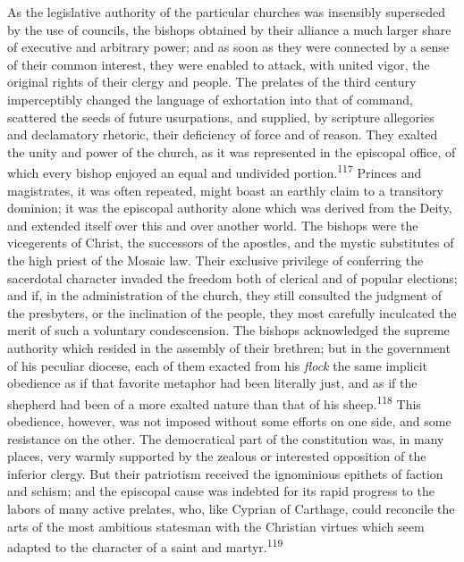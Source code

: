 As the legislative authority of the particular churches was
insensibly superseded by the use of councils, the bishops
obtained by their alliance a much larger share of executive and
arbitrary power; and as soon as they were connected by a sense of
their common interest, they were enabled to attack, with united
vigor, the original rights of their clergy and people. The
prelates of the third century imperceptibly changed the language
of exhortation into that of command, scattered the seeds of
future usurpations, and supplied, by scripture allegories and
declamatory rhetoric, their deficiency of force and of reason.
They exalted the unity and power of the church, as it was
represented in the episcopal office, of which every bishop
enjoyed an equal and undivided portion.\textsuperscript{117} Princes and
magistrates, it was often repeated, might boast an earthly claim
to a transitory dominion; it was the episcopal authority alone
which was derived from the Deity, and extended itself over this
and over another world. The bishops were the vicegerents of
Christ, the successors of the apostles, and the mystic
substitutes of the high priest of the Mosaic law. Their exclusive
privilege of conferring the sacerdotal character invaded the
freedom both of clerical and of popular elections; and if, in the
administration of the church, they still consulted the judgment
of the presbyters, or the inclination of the people, they most
carefully inculcated the merit of such a voluntary condescension.
The bishops acknowledged the supreme authority which resided in
the assembly of their brethren; but in the government of his
peculiar diocese, each of them exacted from his \textit{flock} the same
implicit obedience as if that favorite metaphor had been
literally just, and as if the shepherd had been of a more exalted
nature than that of his sheep.\textsuperscript{118} This obedience, however, was
not imposed without some efforts on one side, and some resistance
on the other. The democratical part of the constitution was, in
many places, very warmly supported by the zealous or interested
opposition of the inferior clergy. But their patriotism received
the ignominious epithets of faction and schism; and the episcopal
cause was indebted for its rapid progress to the labors of many
active prelates, who, like Cyprian of Carthage, could reconcile
the arts of the most ambitious statesman with the Christian
virtues which seem adapted to the character of a saint and
martyr.\textsuperscript{119}


